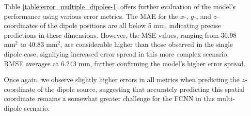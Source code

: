 \documentclass[a4paper, UKenglish, 11pt]{uiomaster}
\begin{document}
Table \ref{table:error_multiple_dipoles-1} offers further evaluation of the model's performance using various error metrics. The MAE for the $x$-, $y$-, and $z$-coordinates of the dipole positions are all below 5 mm, indicating precise predictions in these dimensions. However, the MSE values, ranging from 36.98 mm$^2$ to 40.83 mm$^2$, are considerable higher than those observed in the single dipole case, signifying increased error spread in this more complex scenario. RMSE averages at 6.243 mm, further confirming the model's higher error spread.

Once again, we observe slightly higher errors in all metrics when predicting the $z$-coordinate of the dipole source, suggesting that accurately predicting this spatial coordinate remains a somewhat greater challenge for the FCNN in this multi-dipole scenario.
\end{document}
